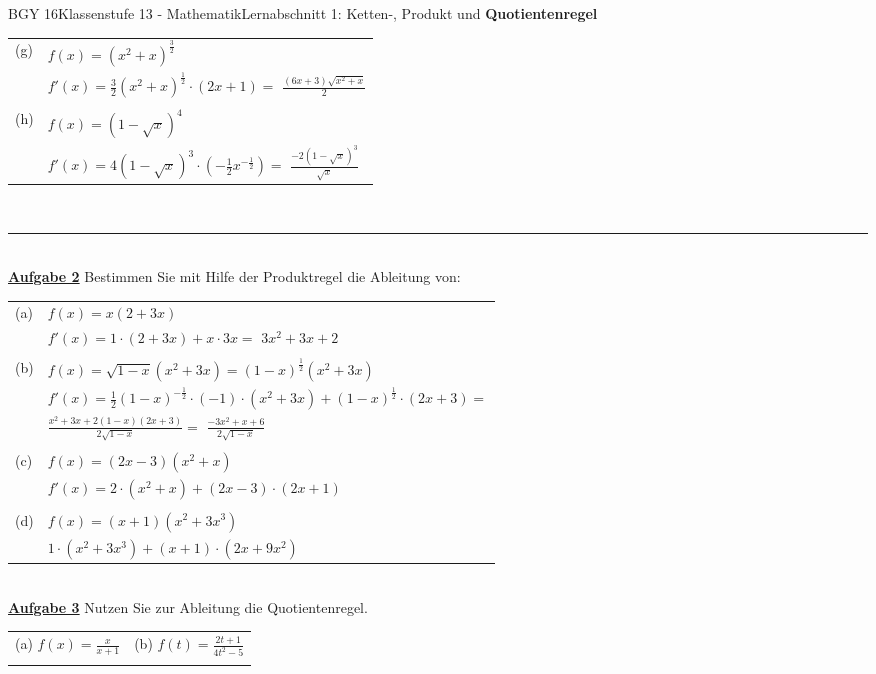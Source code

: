 \documentclass[oneside,openany,headings=optiontotoc,11pt,numbers=noenddot]{scrreprt}
\begin{document}
\begin{worksheet}{BGY 16}{Klassenstufe 13 - Mathematik}{Lernabschnitt 1: Ketten-, Produkt und \textbf{Quotientenregel}}
\begin{framed}
\begin{tabularx}{\textwidth}{lX}
				(g) & \(f(x) = (x^2+x)^{\frac{3}{2}}\)\\
				& \(f'(x) = \frac{3}{2}(x^2+x)^{\frac{1}{2}}\cdot(2x+1) =\) \colorbox{green!10}{\(\frac{(6x+3)\sqrt{x^2+x}}{2}\)}\\
				\\
				(h) & \(f(x) = (1-\sqrt{x})^4\)\\
				& \(f'(x) = 4(1-\sqrt{x})^3\cdot{}(-\frac{1}{2}x^{-\frac{1}{2}}) =\) \colorbox{green!10}{\(\frac{-2(1-\sqrt{x})^3}{\sqrt{x}}\)}
			\end{tabularx}\\
			\par\noindent
			\rule{0.9\textwidth}{0.1pt}\\
			\textbf{\underline{Aufgabe 2}} Bestimmen Sie mit Hilfe der Produktregel die Ableitung von:\\
			\par\noindent
			\begin{tabularx}{\textwidth}{lX}
				(a) & \(f(x) = x(2+3x)\)\\
				& \(f'(x) = 1\cdot(2+3x) + x\cdot{}3x =\) \colorbox{green!10}{\(3x^2 + 3x +2\)}\\
				\\
				(b) & \(f(x) = \sqrt{1-x}(x^2+3x) = (1-x)^{\frac{1}{2}}(x^2+3x)\)\\
				& \(f'(x) = \frac{1}{2}(1-x)^{-\frac{1}{2}}\cdot(-1)\cdot(x^2+3x) + (1-x)^{\frac{1}{2}}\cdot{}(2x+3) =\)\\
				& \(\frac{x^2+3x+2(1-x)(2x+3)}{2\sqrt{1-x}} =\) \colorbox{green!10}{\(\frac{-3x^2+x+6}{2\sqrt{1-x}}\)}\\
				\\
				(c) & \(f(x) = (2x-3)(x^2+x)\)\\
				& \colorbox{green!10}{\(f'(x) = 2\cdot(x^2+x) + (2x-3)\cdot(2x+1)\)}\\
				\\
				(d) & \(f(x) = (x+1)(x^2+3x^3)\)\\
				& \colorbox{green!10}{\(1\cdot(x^2+3x^3) + (x+1)\cdot(2x+9x^2)\)}
			\end{tabularx}\\
			\newpage
			\textbf{\underline{Aufgabe 3}} Nutzen Sie zur Ableitung die Quotientenregel.\\
			\par
			\begin{tabularx}{\textwidth}{XX}
				(a) \(f(x) = \frac{x}{x+1}\) & (b) \(f(t) = \frac{2t+1}{4t^2-5}\) \\
				\\

\end{tabularx}
\end{framed}
\end{worksheet}
\end{document}

